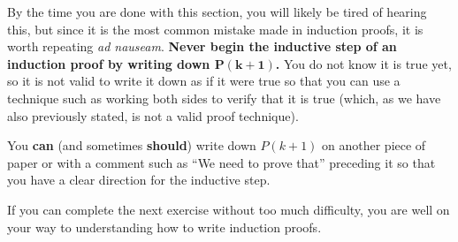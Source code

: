 \begin{rem}
By the time you are done with this section, you will likely be tired of hearing this, 
but since it is the most common mistake made in induction proofs, it is worth repeating {\em ad nauseam}.
{\bf Never begin the inductive step of an induction proof by writing down $\mathbf{P(k+1)}$.}
You do not know it is true yet, so it is not valid to write it down as if it were true so that
you can use a technique such as working both sides to verify that it is true (which, as we have
also previously stated, is not a valid proof technique).

You {\bf can} (and sometimes {\bf should}) write down $P(k+1)$ on another piece of paper
or with a comment such as ``We need to prove that'' preceding it
so that you have a clear direction for the inductive step.
\end{rem}

If you can complete the next exercise without too much difficulty, 
you are well on your way to understanding how to write induction proofs.


